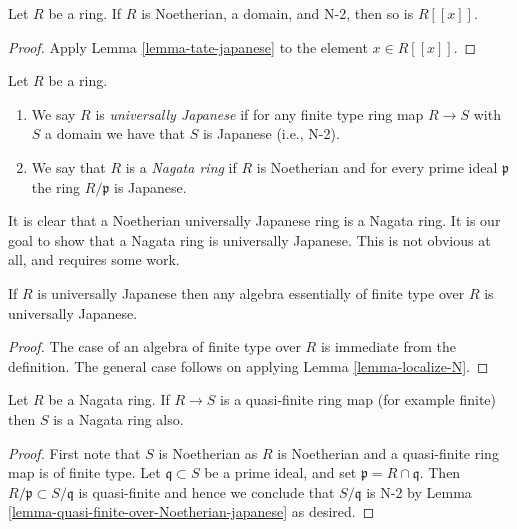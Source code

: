 \begin{lemma}
\label{lemma-power-series-over-N-2}
Let $R$ be a ring.
If $R$ is Noetherian, a domain, and N-2, then so is $R[[x]]$.
\end{lemma}

\begin{proof}
Apply Lemma \ref{lemma-tate-japanese} to the element $x \in R[[x]]$.
\end{proof}

\begin{definition}
\label{definition-nagata}
Let $R$ be a ring.
\begin{enumerate}
\item We say $R$ is {\it universally Japanese} if for any finite
type ring map $R \to S$ with $S$ a domain we have that $S$ is
Japanese (i.e., N-2).
\item We say that $R$ is a {\it Nagata ring} if $R$ is Noetherian and
for every prime ideal $\mathfrak p$ the ring $R/\mathfrak p$ is Japanese.
\end{enumerate}
\end{definition}

\noindent
It is clear that a Noetherian universally Japanese ring is a Nagata ring.
It is our goal to show that a Nagata ring is universally Japanese. This is
not obvious at all, and requires some work.

\begin{lemma}
\label{lemma-universally-japanese}
If $R$ is universally Japanese then any algebra essentially of finite type
over $R$ is universally Japanese.
\end{lemma}

\begin{proof}
The case of an algebra of finite type over $R$ is immediate from
the definition. The general case follows on applying
Lemma \ref{lemma-localize-N}.
\end{proof}

\begin{lemma}
\label{lemma-quasi-finite-over-nagata}
Let $R$ be a Nagata ring.
If $R \to S$ is a quasi-finite ring map (for example finite)
then $S$ is a Nagata ring also.
\end{lemma}

\begin{proof}
First note that $S$ is Noetherian as $R$ is Noetherian and a quasi-finite
ring map is of finite type.
Let $\mathfrak q \subset S$ be a prime ideal, and set
$\mathfrak p = R \cap \mathfrak q$. Then
$R/\mathfrak p \subset S/\mathfrak q$ is quasi-finite and
hence we conclude that $S/\mathfrak q$ is N-2 by
Lemma \ref{lemma-quasi-finite-over-Noetherian-japanese}
as desired.
\end{proof}

